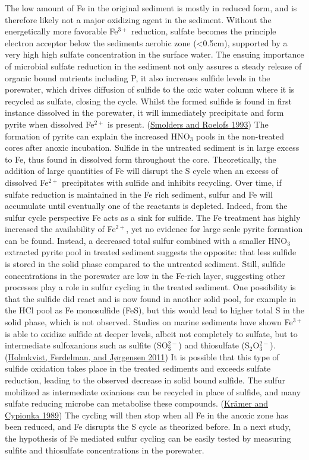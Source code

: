 \documentclass[a4paper,11pt]{article}
\begin{document}
The low amount of Fe in the original sediment is mostly in reduced form, and is therefore likely not a major oxidizing agent in the sediment. Without the energetically more favorable Fe\(^{3+}\) reduction, sulfate becomes the principle electron acceptor below the sediments aerobic zone (\textless0.5cm), supported by a very high high sulfate concentration in the surface water. The ensuing importance of microbial sulfate reduction in the sediment not only assures a steady release of organic bound nutrients including P, it also increases sulfide levels in the porewater, which drives diffusion of sulfide to the oxic water column where it is recycled as sulfate, closing the cycle. Whilst the formed sulfide is found in first instance dissolved in the porewater, it will immediately precipitate and form pyrite when dissolved Fe\(^{2+}\) is present. (\protect\hyperlink{ref-smoldersSulphatemediatedIronLimitation1993}{Smolders and Roelofs 1993}) The formation of pyrite can explain the increased HNO\(_3\) pools in the non-treated cores after anoxic incubation. Sulfide in the untreated sediment is in large excess to Fe, thus found in dissolved form throughout the core. Theoretically, the addition of large quantities of Fe will disrupt the S cycle when an excess of dissolved Fe\(^{2+}\) precipitates with sulfide and inhibits recycling. Over time, if sulfate reduction is maintained in the Fe rich sediment, sulfur and Fe will accumulate until eventually one of the reactants is depleted. Indeed, from the sulfur cycle perspective Fe acts as a sink for sulfide. The Fe treatment has highly increased the availability of Fe\(^{2+}\), yet no evidence for large scale pyrite formation can be found. Instead, a decreased total sulfur combined with a smaller HNO\(_3\) extracted pyrite pool in treated sediment suggests the opposite: that less sulfide is stored in the solid phase compared to the untreated sediment. Still, sulfide concentrations in the porewater are low in the Fe-rich layer, suggesting other processes play a role in sulfur cycling in the treated sediment. One possibility is that the sulfide did react and is now found in another solid pool, for example in the HCl pool as Fe monosulfide (FeS), but this would lead to higher total S in the solid phase, which is not observed. Studies on marine sediments have shown Fe\(^{3+}\) is able to oxidize sulfide at deeper levels, albeit not completely to sulfate, but to intermediate sulfoxanions such as sulfite (SO\(_3^{2-}\)) and thiosulfate (S\(_2\)O\(_3^{2-}\)). (\protect\hyperlink{ref-holmkvistHolmkvistFerdelmanTG2011}{Holmkvist, Ferdelman, and Jørgensen 2011}) It is possible that this type of sulfide oxidation takes place in the treated sediments and exceeds sulfate reduction, leading to the observed decrease in solid bound sulfide. The sulfur mobilized as intermediate oxianions can be recycled in place of sulfide, and many sulfate reducing microbe can metabolise these compounds. (\protect\hyperlink{ref-kramerSulfateFormationATP1989}{Krämer and Cypionka 1989}) The cycling will then stop when all Fe in the anoxic zone has been reduced, and Fe disrupts the S cycle as theorized before. In a next study, the hypothesis of Fe mediated sulfur cycling can be easily tested by measuring sulfite and thiosulfate concentrations in the porewater.
\end{document}
